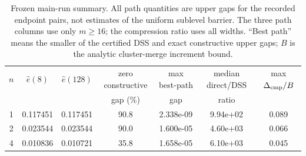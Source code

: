 \begin{table}[t]
\caption{Frozen main-run summary. All path quantities are upper gaps for the recorded endpoint pairs, not estimates of the uniform sublevel barrier. The three path columns use only $m\ge16$; the compression ratio uses all widths. ``Best path'' means the smaller of the certified DSS and exact constructive upper gaps; $B$ is the analytic cluster-merge increment bound.}
\label{tab:main-computation}
\centering
\scriptsize
\setlength{\tabcolsep}{3pt}
\begin{tabular}{@{}ccccccc@{}}
\toprule
$n$ & $\widehat e(8)$ & $\widehat e(128)$ & zero constructive & max best-path & median direct/DSS & max $\Delta_{\rm cmp}/B$ \\
 & & & gap (\%) & gap & ratio & \\
\midrule
1 & 0.117451 & 0.117451 & 90.8 & 2.338e-09 & 9.94e+02 & 0.089 \\
2 & 0.023544 & 0.023544 & 90.0 & 1.600e-05 & 4.60e+03 & 0.066 \\
4 & 0.010836 & 0.010721 & 35.8 & 1.658e-05 & 6.10e+03 & 0.045 \\
\bottomrule
\end{tabular}
\end{table}
